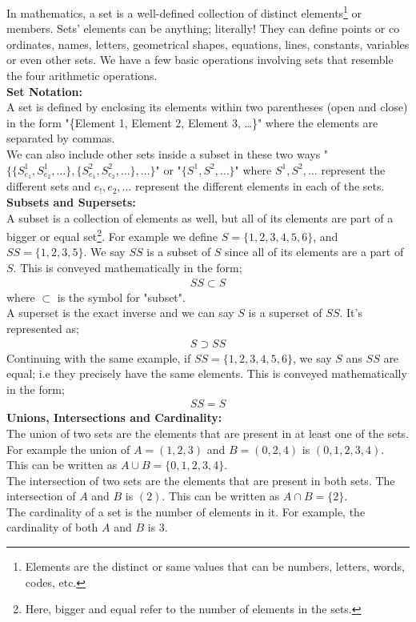 \begin{mathbox}{}
{In mathematics, a set is a well-defined collection of distinct elements\footnote{Elements are the distinct or same values that can be numbers, letters, words, codes, etc.} or members. Sets' elements can be anything; literally! They can define points or co ordinates, names, letters, geometrical shapes, equations, lines, constants, variables or even other sets. We have a few basic operations involving sets that resemble the four arithmetic operations.\\
\textbf{Set Notation:}\\
A set is defined by enclosing its elements within two parentheses (open and close) in the form "\{Element 1, Element 2, Element 3, \dots\}" where the elements are separated by commas.\\
We can also include other sets inside a subset in these two ways "$\{\{S^1_{e_1}, S^1_{e_2}, \dots\}, \{S^2_{e_1}, S^2_{e_2}, \dots\}, \dots\}$" or "$\{S^1, S^2, \dots\}$" where $S^1, S^2, \dots$ represent the different sets and $e_!, e_2,\dots$ represent the different elements in each of the sets.\\
\textbf{Subsets and Supersets:}\\
A subset is a collection of elements as well, but all of its elements are part of a bigger or equal set\footnote{Here, bigger and equal refer to the number of elements in the sets.}. For example we define $S = \{1, 2, 3, 4, 5, 6\}$, and $SS = \{1, 2, 3, 5\}$. We say $SS$ is a subset of $S$ since all of its elements are a part of $S$. This is conveyed mathematically in the form; 
\begin{align*}
    SS \subset S
\end{align*} where $\subset$ is the symbol for "subset".\\
A superset is the exact inverse and we can say $S$ is a superset of $SS$. It's represented as; 
\begin{align*}
S \supset SS    
\end{align*}
Continuing with the same example, if $SS = \{1, 2, 3, 4, 5, 6\}$, we say $S$ ans $SS$ are equal; i.e they precisely have the same elements. This is conveyed mathematically in the form; 
\begin{align*}
    SS = S
\end{align*}
\textbf{Unions, Intersections and Cardinality:}\\
The union of two sets are the elements that are present in at least one of the sets. For example the union of $A = (1, 2, 3)$ and $B = (0, 2, 4)$ is $(0, 1, 2, 3, 4)$. This can be written as $A \cup B = \{0, 1, 2, 3, 4\}$.\\
The intersection of two sets are the elements that are present in both sets. The intersection of $A$ and $B$ is $(2)$. This can be written as $A \cap B = \{2\}$.\\
The cardinality of a set is the number of elements in it. For example, the cardinality of both $A$ and $B$ is $3$.}
\end{mathbox}
